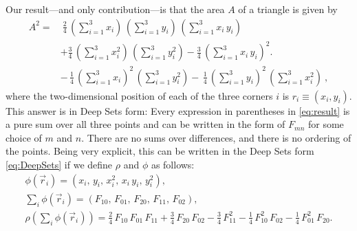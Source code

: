 \documentclass[12pt]{article}
\begin{document}
Our result---and only contribution---is that the area $A$ of a triangle is given by
\begin{align}
    A^2 = & \
    \frac{2}{4} \, (\sum_{i=1}^{3} x_i ) \, (\sum_{i=1}^{3} y_i ) \, (\sum_{i=1}^{3} x_i \, y_i )
    \nonumber \\ &
    + \frac{3}{4} \, (\sum_{i=1}^{3} x_i^2 ) \, (\sum_{i=1}^{3} y_i^2 )
    - \frac{3}{4} \, (\sum_{i=1}^{3} x_i \, y_i )^2.
    \nonumber \\ &
    - \, \frac{1}{4} \, (\sum_{i=1}^{3} x_i )^2 \, (\sum_{i=1}^{3} y_i^2 )
    - \, \frac{1}{4} \, (\sum_{i=1}^{3} y_i )^2 \, (\sum_{i=1}^{3} x_i^2 )
     ~, \label{eq:result}
\end{align}
where the two-dimensional position of each of the three corners $i$ is $r_i \equiv (x_i, y_i)$.
This answer is in Deep Sets form:
Every expression in parentheses in \eqref{eq:result} is a pure sum over all three points and can be written in the form of $F_{mn}$ for some choice of $m$ and $n$.
There are no sums over differences, and there is no ordering of the points.
Being very explicit, this can be written in the Deep Sets form \eqref{eq:DeepSets} if we define $\rho$ and $\phi$ as follows:
\begin{gather}
    \phi(\vec{r}_i) = (
        x_i, \,
        y_i, \,
        x_i^2, \,
        x_i \, y_i, \,
        y_i^2
    ), \\
    {\textstyle \sum_i} \phi(\vec{r}_i) = (
        F_{10}, \,
        F_{01}, \,
        F_{20}, \,
        F_{11}, \,
        F_{02}
    ), \\
    \rho \left( {\textstyle \sum_i} \phi(\vec{r}_i) \right)
    = \tfrac{2}{4} \, F_{10} \, F_{01} \, F_{11}
    + \tfrac{3}{4} \, F_{20} \, F_{02}
    - \tfrac{3}{4} \, F_{11}^2
    - \tfrac{1}{4} \, F_{10}^2 \, F_{02}
    - \tfrac{1}{4} \, F_{01}^2 \, F_{20}.
\end{gather}
\end{document}
